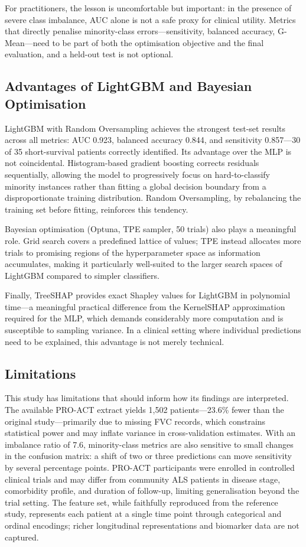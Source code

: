 \documentclass[a4paper,twoside]{article}
\begin{document}
For practitioners, the lesson is uncomfortable but important: in the presence
of severe class imbalance, AUC alone is not a safe proxy for clinical utility.
Metrics that directly penalise minority-class errors---sensitivity, balanced
accuracy, G-Mean---need to be part of both the optimisation objective and the
final evaluation, and a held-out test is not optional.

\subsection{Advantages of LightGBM and Bayesian Optimisation}

LightGBM with Random Oversampling achieves the strongest test-set results across
all metrics: AUC 0.923, balanced accuracy 0.844, and sensitivity 0.857---30 of
35 short-survival patients correctly identified. Its advantage over the MLP is
not coincidental. Histogram-based gradient boosting corrects residuals
sequentially, allowing the model to progressively focus on hard-to-classify
minority instances rather than fitting a global decision boundary from a
disproportionate training distribution. Random Oversampling, by rebalancing the
training set before fitting, reinforces this tendency.

Bayesian optimisation (Optuna, TPE sampler, 50 trials) also plays a meaningful
role. Grid search covers a predefined lattice of values; TPE instead allocates
more trials to promising regions of the hyperparameter space as information
accumulates, making it particularly well-suited to the larger search spaces of
LightGBM compared to simpler classifiers.

Finally, TreeSHAP provides exact Shapley values for LightGBM in polynomial
time---a meaningful practical difference from the KernelSHAP approximation
required for the MLP, which demands considerably more computation and is
susceptible to sampling variance. In a clinical setting where individual
predictions need to be explained, this advantage is not merely technical.

\subsection{Limitations}

This study has limitations that should inform how its findings are interpreted.
The available PRO-ACT extract yields 1,502 patients---23.6\% fewer than the
original study---primarily due to missing FVC records, which constrains
statistical power and may inflate variance in cross-validation estimates.
With an imbalance ratio of 7.6, minority-class metrics are also sensitive to
small changes in the confusion matrix: a shift of two or three predictions can
move sensitivity by several percentage points. PRO-ACT participants were
enrolled in controlled clinical trials and may differ from community ALS patients
in disease stage, comorbidity profile, and duration of follow-up, limiting 
generalisation beyond the trial setting. The feature set, while faithfully
reproduced from the reference study, represents each patient at a single time
point through categorical and ordinal encodings; richer longitudinal
representations and biomarker data are not captured.
\end{document}
